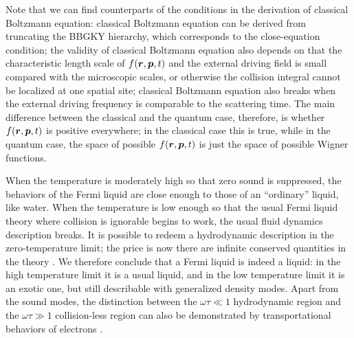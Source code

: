 \documentclass[hyperref, a4paper]{article}
\begin{document}
Note that we can find counterparts of the conditions 
in the derivation of classical Boltzmann equation:
classical Boltzmann equation can be derived from 
truncating the BBGKY hierarchy,
which corresponds to the close-equation condition;
the validity of classical Boltzmann equation 
also depends on that the characteristic length scale 
of $f(\vb*{r}, \vb*{p} , t)$ and the external driving field 
is small compared with the microscopic scales,
or otherwise the collision integral cannot be localized 
at one spatial site; 
classical Boltzmann equation also breaks 
when the external driving frequency is comparable
to the scattering time.
The main difference between the classical and the quantum case, 
therefore, is whether $f(\vb*{r}, \vb*{p}, t)$ is positive everywhere;
in the classical case this is true, 
while in the quantum case, 
the space of possible $f(\vb*{r}, \vb*{p}, t)$
is just the space of possible Wigner functions. 

When the temperature is moderately high 
so that zero sound is suppressed,
the behaviors of the Fermi liquid 
are close enough to those of an ``ordinary'' liquid, like water.
When the temperature is low enough so that 
the usual Fermi liquid theory 
where collision is ignorable 
begins to work,
the usual fluid dynamics description breaks.
It is possible to redeem a hydrodynamic description in the zero-temperature limit;
the price is now there are infinite conserved quantities in the theory
\cite{Wen2007}. 
We therefore conclude that a Fermi liquid is indeed a liquid: 
in the high temperature limit it is a usual liquid,
and in the low temperature limit it is an exotic one,
but still describable with generalized density modes.
Apart from the sound modes,
the distinction between the $\omega \tau \ll 1$ hydrodynamic region
and the $\omega \tau \gg 1$ collision-less region 
can also be demonstrated by transportational behaviors of electrons
\cite{lucas2015hydrodynamic,lucas2018hydrodynamics,sulpizio2019visualizing}.

\printbibliography
\end{document}
